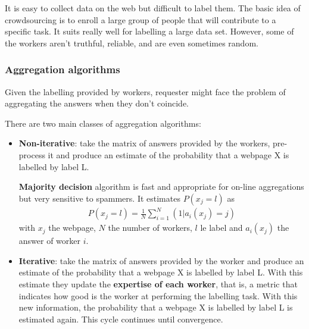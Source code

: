 It is easy to collect data on the web but difficult to label them. The basic idea of crowdsourcing is to enroll a large group of people that will contribute to a specific task. It suits really well for labelling a large data set. However, some of the workers aren't truthful, reliable, and are even sometimes random.

\subsubsection*{Aggregation algorithms}
Given the labelling provided by workers, requester might face the problem of aggregating the answers when they don't coincide.

There are two main classes of aggregation algorithms:
\begin{itemize}
	\item \textbf{Non-iterative}: take the matrix of answers provided by the workers, pre-process it and produce an estimate of the probability that a webpage X is labelled by label L.

	\textbf{Majority decision} algorithm is fast and appropriate for on-line aggregations but very sensitive to spammers. It estimates $P(x_j = l)$ as 
	\begin{align*}
		P(x_j = l) = \frac{1}{N} \sum_{i = 1}^N (1 | a_i(x_j) = j)
	\end{align*}
	with $x_j$ the webpage, $N$ the number of workers, $l$ le label and $a_i(x_j)$ the answer of worker $i$.

	\item \textbf{Iterative}: take the matrix of answers provided by the worker and produce an estimate of the probability that a webpage X is labelled by label L. With this estimate they update the \textbf{expertise of each worker}, that is, a metric that indicates how good is the worker at performing the labelling task. With this new information, the probability that a webpage X is labelled by label L is estimated again. This cycle continues until convergence.
\end{itemize}